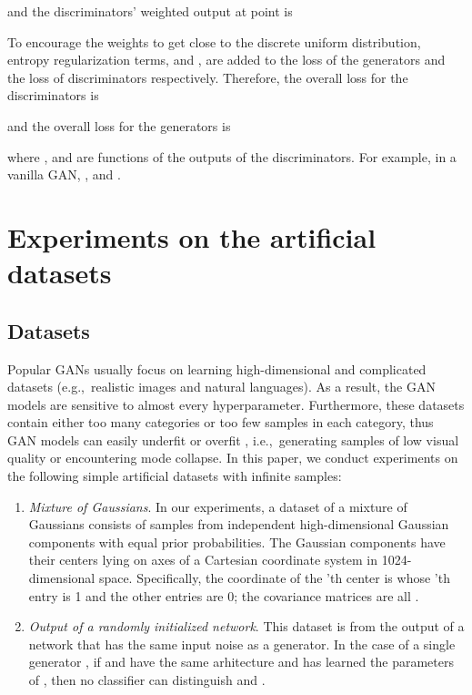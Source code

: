 \documentclass[conference]{IEEEtran}
\newcommand{\eg}{{e.g.,~}}
\newcommand{\ie}{{i.e.,~}}
\begin{document}
and the discriminators' weighted output at point  is

To encourage the weights to get close to the discrete uniform distribution, entropy regularization terms,  and , are added to the loss of the generators and the loss of discriminators respectively.
Therefore, the overall loss for the discriminators is

and the  overall loss for the generators is

where ,  and  are functions of the outputs of the discriminators. For example, in a vanilla GAN, ,  and . \section{Experiments on the artificial datasets}

\subsection{Datasets}
Popular GANs usually focus on learning high-dimensional and complicated datasets (\eg realistic images and natural languages). As a result, the GAN models are sensitive to almost every hyperparameter. Furthermore, these datasets contain either too many categories or too few samples in each category, thus GAN models can easily underfit or overfit \cite{comparison_of_ml_and_gan}, \ie generating samples of low visual quality or encountering mode collapse. In this paper, we conduct experiments on the following simple artificial datasets with infinite samples:
\begin{enumerate}	
	\item \textit{Mixture of Gaussians}. In our experiments, a dataset of a mixture of Gaussians consists of samples from independent high-dimensional Gaussian components with equal prior probabilities. The Gaussian components have their centers lying on axes of a Cartesian coordinate system in 1024-dimensional space. Specifically, the coordinate of the 'th center is  whose 'th entry is 1 and the other entries are 0; the covariance matrices are all . 
	
	\item \textit{Output of a randomly initialized network}. This dataset is from the output of a network  that has the same input noise as a generator. In the case of a single generator , if  and  have the same arhitecture and  has learned the parameters of , then no classifier can distinguish  and .
\end{enumerate}
\end{document}

